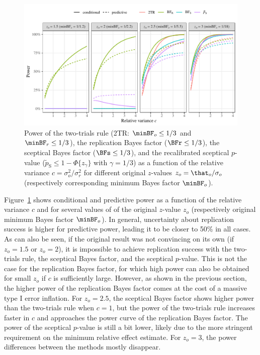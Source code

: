 \begin{figure}
\begin{knitrout}
\color{fgcolor}
\includegraphics[width=\maxwidth]{images/paper1/power-plots-1}
\end{knitrout}
\caption{Power of the two-trials rule (2TR: $\minBF_{o} \leq
1/3$ and $\minBF_{r} \leq
1/3$), the replication Bayes factor ($\BFr
\leq 1/3$), the sceptical Bayes factor ($\BFs
\leq
1/3$), and the recalibrated sceptical $p$-value ($\tilde{p}_{\mathrm{S}}
\leq 1 - \Phi\{z_{\gamma}\}$ with $\gamma =
1/3$) as a function of the relative variance $c
= \sigma^2_o/\sigma^2_r$ for different original $z$-values $z_o =
\that_o/\sigma_o$ (respectively corresponding minimum Bayes factor $\minBF_o$).}
\label{fig:condpower}
\end{figure}

Figure~\ref{fig:condpower} shows conditional and predictive power as a function
of the relative variance $c$ and for several values of of the original $z$-value
$z_o$ (respectively original minimum Bayes factor $\minBF_{o}$). In general,
uncertainty about replication success is higher for predictive power, leading it
to be closer to 50\% in all cases. As can also be seen, if the original result
was not convincing on its own (\eg if $z_o = 1.5$ or $z_{o} = 2$), it is
impossible to achieve replication success with the two-trials rule, the
sceptical Bayes factor, and the sceptical $p$-value. This is not the case for
the replication Bayes factor, for which high power can also be obtained for
small $z_o$ if $c$ is sufficiently large. However, as shown in the previous
section, the higher power of the replication Bayes factor comes at the cost of a
massive type I error inflation. For $z_o = 2.5$, the sceptical Bayes factor
shows higher power than the two-trials rule when $c = 1$, but the power of the
two-trials rule increases faster in $c$ and approaches the power curve of the
replication Bayes factor. The power of the sceptical $p$-value is still a bit
lower, likely due to the more stringent requirement on the minimum relative
effect estimate. For $z_{o} = 3$, the power differences between the methods
mostly disappear.

